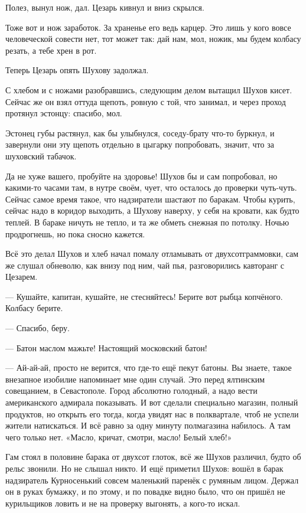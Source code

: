 Полез, вынул нож, дал. Цезарь кивнул и вниз скрылся.

Тоже вот и нож \dash заработок. За храненье его \dash ведь карцер. Это лишь у кого вовсе человеческой
совести нет, тот может так: дай нам, мол, ножик, мы будем колбасу резать, а тебе хрен в рот.

Теперь Цезарь опять Шухову задолжал.

С хлебом и с ножами разобравшись, следующим делом вытащил Шухов кисет. Сейчас же он взял
оттуда щепоть, ровную с той, что занимал, и через проход протянул эстонцу: спасибо, мол.

Эстонец губы растянул, как бы улыбнулся, соседу-брату что-то буркнул, и завернули они эту
щепоть отдельно в цыгарку \dash попробовать, значит, что за шуховский табачок.

Да не хуже вашего, пробуйте на здоровье! Шухов бы и сам попробовал, но какими-то часами там, в
нутре своём, чует, что осталось до проверки чуть-чуть. Сейчас самое время такое, что
надзиратели шастают по баракам. Чтобы курить, сейчас надо в коридор выходить, а Шухову
наверху, у себя на кровати, как будто теплей. В бараке ничуть не тепло, и та же обметь снежная
по потолку. Ночью продрогнешь, но пока сносно кажется.

Всё это делал Шухов и хлеб начал помалу отламывать от двухсотграммовки, сам же слушал
обневолю, как внизу под ним, чай пья, разговорились кавторанг с Цезарем.

--- Кушайте, капитан, кушайте, не стесняйтесь! Берите вот рыбца копчёного. Колбасу берите.

--- Спасибо, беру.

--- Батон маслом мажьте! Настоящий московский батон!

--- Ай-ай-ай, просто не верится, что где-то ещё пекут батоны. Вы знаете, такое внезапное
изобилие напоминает мне один случай. Это перед ялтинским совещанием, в Севастополе. Город \dash
абсолютно голодный, а надо вести американского адмирала показывать. И вот сделали
специально магазин, полный продуктов, но открыть его тогда, когда увидят нас в полквартале,
чтоб не успели жители натискаться. И всё равно за одну минуту полмагазина набилось. А там \dash
чего только нет. «Масло, кричат, смотри, масло! Белый хлеб!»

Гам стоял в половине барака от двухсот глоток, всё же Шухов различил, будто об рельс звонили.
Но не слышал никто. И ещё приметил Шухов: вошёл в барак надзиратель Курносенький \dash совсем
маленький паренёк с румяным лицом. Держал он в руках бумажку, и по этому, и по повадке видно
было, что он пришёл не курильщиков ловить и не на проверку выгонять, а кого-то искал.


